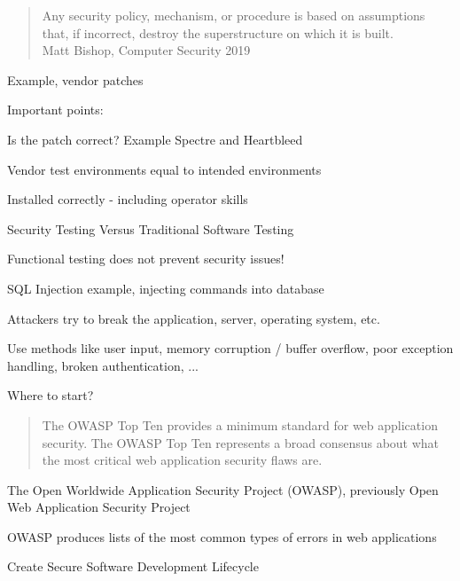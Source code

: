 \documentclass[Screen16to9,17pt]{foils}
\begin{document}

\begin{quote}
Any security policy, mechanism, or procedure is based on assumptions that, if incorrect, destroy the superstructure on which it is built.\\
Matt Bishop, Computer Security 2019
\end{quote}

\begin{list1}
\item Example, vendor patches
\item Important points:
\begin{list2}
\item Is the patch correct? Example Spectre and Heartbleed
\item Vendor test environments equal to intended environments
\item Installed correctly - including operator skills
\end{list2}
\end{list1}





\begin{list2}
\item Security Testing Versus Traditional Software Testing
\item Functional testing does not prevent security issues!
\item SQL Injection example, injecting commands into database
\item Attackers try to break the application, server, operating system, etc.
\item Use methods like user input, memory corruption / buffer overflow, poor exception handling, broken authentication, ...
\end{list2}

\vskip 2cm
\centerline{\LARGE Where to start?}



\begin{quote}
The OWASP Top Ten provides a minimum standard for web application
security. The OWASP Top Ten represents a broad consensus about what
the most critical web application security flaws are.
\end{quote}

\begin{list1}
\item The Open Worldwide Application Security Project (OWASP), previously Open Web Application Security Project
\item OWASP produces lists of the most common types of errors in web applications
\item {}
\item Create Secure Software Development Lifecycle
\end{list1}
\end{document}

